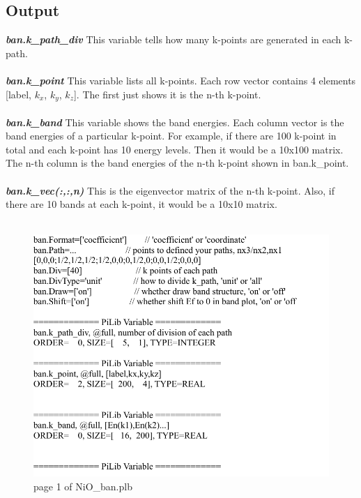 \documentclass[10pt,a4paper]{article}
\begin{document}
\subsection{Output}
\textit{\textbf{ban.k\_path\_div}} This variable tells how many k-points are generated in each k-path.\\ \\
\textit{\textbf{ban.k\_point}} This variable lists all k-points. Each row vector contains 4 elements [label, $k_{x}$, $k_{y}$, $k_{z}$]. The first just shows it is the n-th k-point. \\ \\
\textit{\textbf{ban.k\_band}} This variable shows the band energies. Each column vector is the band energies of a particular k-point. For example, if there are 100 k-point in total and each k-point has 10 energy levels. Then it would be a 10x100 matrix. The n-th column is the band energies of the n-th k-point shown in ban.k\_point. \\ \\
\textit{\textbf{ban.k\_vec(:,:,n)}} This is the eigenvector matrix of the n-th k-point. Also, if there are 10 bands at each k-point, it would be a 10x10 matrix.\\ \\  


\begin{figure}[tbp]
\centering
\includegraphics[width=0.9\columnwidth]{NiO_ban.pdf}
\caption{page 1 of NiO\_ban.plb}
\end{figure}
\end{document}
